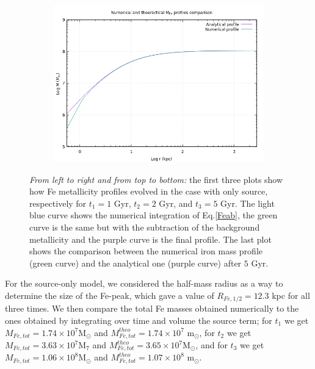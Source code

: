 \documentclass{article}
\begin{document}
\begin{figure}[H]
\begin{subfigure}{0.49\textwidth}
	\end{subfigure}
	\begin{subfigure}{0.49\textwidth}
		\includegraphics[width=0.9\linewidth]{femass_comparison.png}
	\end{subfigure}
	\caption{\textit{From left to right and from top to bottom:} the first three plots show how Fe metallicity profiles evolved in the case with only source, respectively for $t_{1}=1 $ Gyr, $t_{2}=2$ Gyr, and $t_{3}=5$ Gyr. The light blue curve shows the numerical integration of Eq.\eqref{Feab}, the green curve is the same but with the subtraction of the background metallicity and the purple curve is the final profile.
	The last plot shows the comparison between the numerical iron mass profile (green curve) and the analytical one (purple curve) after $5$ Gyr.}
	\label{fig:Zsourceonly}
\end{figure}
For the source-only model, we considered the half-mass radius as a way to determine the size of the Fe-peak, which gave a value of $R_{Fe,1/2}=12.3$ kpc for all three times. We then compare the total Fe masses obtained numerically to the ones obtained by integrating over time and volume the source term; for $t_{1}$ we get $M_{Fe,tot}=1.74\times10^{7}$M$_{\odot}$ and $M_{Fe,tot}^{theo}=1.74\times10^{7}$ m$_{\odot}$, for $t_{2}$ we get $M_{Fe,tot}=3.63\times10^{7}$M$_{7}$ and $M_{Fe,tot}^{theo}=3.65\times 10^{7}$M$_{\odot}$, and for $t_{3}$ we get $M_{Fe,tot}=1.06\times10^{8}$M$_{\odot}$ and $M_{Fe,tot}^{theo}=1.07\times10^{8}$ m$_{\odot}$.
\end{document}
